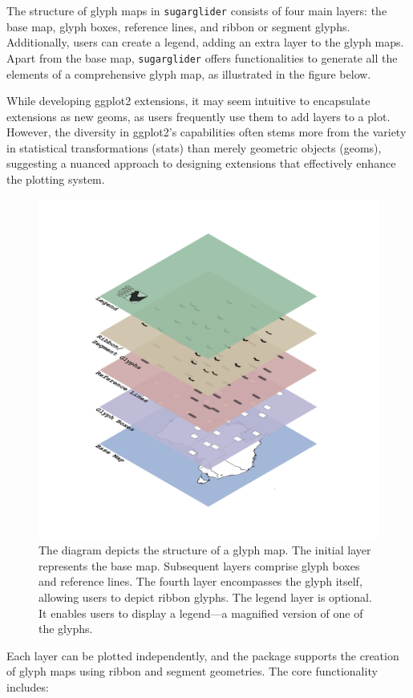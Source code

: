 The structure of glyph maps in \texttt{sugarglider} consists of four main layers: the base map, glyph boxes, reference lines, and ribbon or segment glyphs. Additionally, users can create a legend, adding an extra layer to the glyph maps. Apart from the base map, \texttt{sugarglider} offers functionalities to generate all the elements of a comprehensive glyph map, as illustrated in the figure below.

While developing ggplot2 extensions, it may seem intuitive to encapsulate extensions as new geoms, as users frequently use them to add layers to a plot. However, the diversity in ggplot2's capabilities often stems more from the variety in statistical transformations (stats) than merely geometric objects (geoms), suggesting a nuanced approach to designing extensions that effectively enhance the plotting system.

\begin{figure}

{\centering \includegraphics[width=0.6\linewidth]{figures/glyphmap-layers} 

}

\caption{The diagram depicts the structure of a glyph map. The initial layer represents the base map. Subsequent layers comprise glyph boxes and reference lines. The fourth layer encompasses the glyph itself, allowing users to depict ribbon glyphs. The legend layer is optional. It enables users to display a legend—a magnified version of one of the glyphs.}\label{fig:unnamed-chunk-1}
\end{figure}

Each layer can be plotted independently, and the package supports the creation of glyph maps using ribbon and segment geometries. The core functionality includes:

